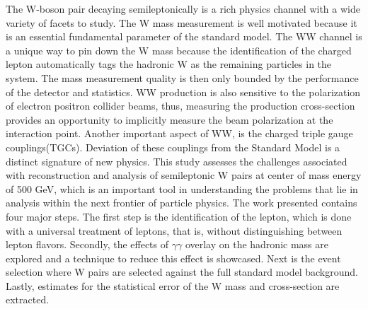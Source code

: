 The W-boson pair decaying semileptonically is a rich physics channel with a wide variety of facets to study. The W mass measurement is well motivated because it is an essential fundamental parameter of the standard model. The WW channel is a unique way to pin down the W mass because the identification of the charged lepton automatically tags the hadronic W as the remaining particles in the system. The mass measurement quality is then only bounded by the performance of the detector and statistics. WW production is also sensitive to the polarization of electron positron collider beams, thus,  measuring the production cross-section provides an opportunity to implicitly measure the beam polarization at the interaction point. Another important aspect of WW, is the charged triple gauge couplings(TGCs). Deviation of these couplings from the Standard Model is a distinct signature of new physics. This study assesses the challenges associated with reconstruction and analysis of semileptonic W pairs at center of mass energy of 500 GeV, which is an important tool in understanding the problems that lie in analysis within the next frontier of particle physics. The work presented contains four major steps. The first step is the identification of the lepton, which is done with a universal treatment of leptons, that is, without distinguishing between lepton flavors.  Secondly, the effects of $\gamma\gamma$ overlay on the hadronic mass are explored and a technique to reduce this effect is showcased. Next is the event selection where W pairs are selected against the full standard model background. Lastly, estimates for the statistical error of the W mass and cross-section are extracted.